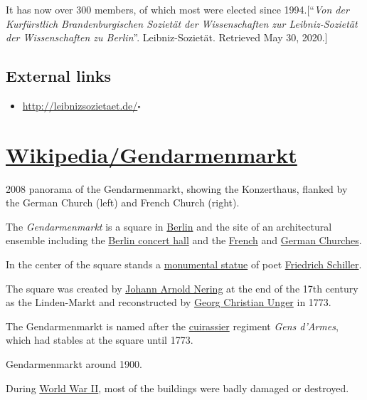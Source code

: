 \documentclass{book}
\numberwithin{equation}{section}
\begin{document}
It has now over 300 members, of which most were elected since 1994.[``\textit{Von der Kurfürstlich Brandenburgischen Sozietät der Wissenschaften zur Leibniz-Sozietät der Wissenschaften zu Berlin}''. Leibniz-Sozietät. Retrieved May 30, 2020.]

\section{External links}
\begin{itemize}
    \item \url{http://leibnizsozietaet.de/}\hfill$\square$
\end{itemize}


\chapter{\href{https://en.wikipedia.org/wiki/Gendarmenmarkt}{Wikipedia/Gendarmenmarkt}}

\textsf{2008 panorama of the Gendarmenmarkt, showing the Konzerthaus, flanked by the German Church (left) and French Church (right).}

The \textit{Gendarmenmarkt} is a square in \href{https://en.wikipedia.org/wiki/Berlin}{Berlin} and the site of an architectural ensemble including the \href{https://en.wikipedia.org/wiki/Konzerthaus_Berlin}{Berlin concert hall} and the \href{https://en.wikipedia.org/wiki/French_Cathedral}{French} and \href{https://en.wikipedia.org/wiki/German_Cathedral}{German Churches}.

In the center of the square stands a \href{https://en.wikipedia.org/wiki/Schiller_Monument_(Berlin)}{monumental statue} of poet \href{https://en.wikipedia.org/wiki/Friedrich_Schiller}{Friedrich Schiller}.

The square was created by \href{https://en.wikipedia.org/wiki/Johann_Arnold_Nering}{Johann Arnold Nering} at the end of the 17th century as the Linden-Markt and reconstructed by \href{https://en.wikipedia.org/wiki/Georg_Christian_Unger}{Georg Christian Unger} in 1773.

The Gendarmenmarkt is named after the \href{https://en.wikipedia.org/wiki/Cuirassier}{cuirassier} regiment \textit{Gens d'Armes}, which had stables at the square until 1773.

\textsf{Gendarmenmarkt around 1900.}

%
During \href{https://en.wikipedia.org/wiki/World_War_II}{World War II}, most of the buildings were badly damaged or destroyed.
\end{document}
